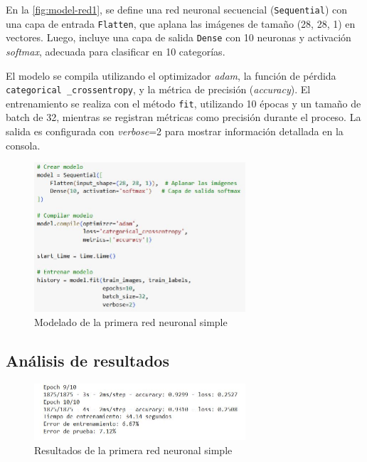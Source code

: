 En la \autoref{fig:model-red1}, se define una red neuronal secuencial (\texttt{Sequential}) con una capa de entrada \texttt{Flatten}, que aplana las imágenes de tamaño (28, 28, 1) en vectores. Luego, incluye una capa de salida \texttt{Dense} con 10 neuronas y activación \textit{softmax}, adecuada para clasificar en 10 categorías.

El modelo se compila utilizando el optimizador \textit{adam}, la función de pérdida \texttt{categorical \_crossentropy}, y la métrica de precisión (\textit{accuracy}). El entrenamiento se realiza con el método \texttt{fit}, utilizando 10 épocas y un tamaño de batch de 32, mientras se registran métricas como precisión durante el proceso. La salida es configurada con \textit{verbose}=2 para mostrar información detallada en la consola.

\begin{figure}[H]
	\centering
	\includegraphics[width=0.7\textwidth]{imgs/model-red1.JPG}
	\caption{Modelado de la primera red neuronal simple}
	\label{fig:model-red1}
\end{figure}

\subsection{Análisis de resultados}

\begin{figure}[H]
	\centering
	\includegraphics[width=0.7\textwidth]{imgs/results-red1.JPG}
	\caption{Resultados de la primera red neuronal simple}
	\label{fig:results-red1}
\end{figure}


